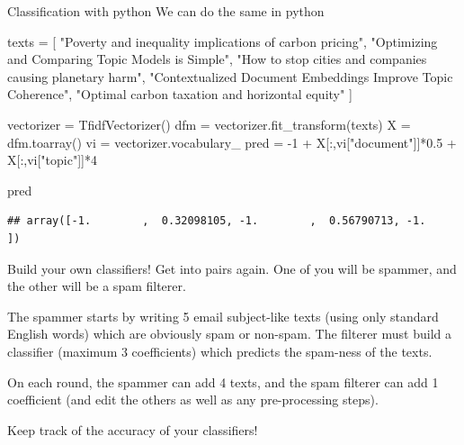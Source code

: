 \documentclass[
  10pt,
  ignorenonframetext,
  aspectratio=169]{beamer}
\newenvironment{Shaded}{\begin{snugshade}}{\end{snugshade}}
\newcommand{\DecValTok}[1]{\textcolor[rgb]{0.86,0.86,0.80}{#1}}
\newcommand{\FloatTok}[1]{\textcolor[rgb]{0.75,0.75,0.82}{#1}}
\newcommand{\NormalTok}[1]{\textcolor[rgb]{0.80,0.80,0.80}{#1}}
\newcommand{\OperatorTok}[1]{\textcolor[rgb]{0.94,0.94,0.82}{#1}}
\newcommand{\StringTok}[1]{\textcolor[rgb]{0.80,0.58,0.58}{#1}}
\begin{document}
\begin{frame}[fragile]{Classification with python}
\protect\hypertarget{classification-with-python}{}
We can do the same in python

\scriptsize

\begin{Shaded}
\begin{Highlighting}[]
\NormalTok{texts }\OperatorTok{=}\NormalTok{ [}
  \StringTok{"Poverty and inequality implications of carbon pricing"}\NormalTok{,}
  \StringTok{"Optimizing and Comparing Topic Models is Simple"}\NormalTok{,}
  \StringTok{"How to stop cities and companies causing planetary harm"}\NormalTok{,}
  \StringTok{"Contextualized Document Embeddings Improve Topic Coherence"}\NormalTok{,}
  \StringTok{"Optimal carbon taxation and horizontal equity"}
\NormalTok{]}

\NormalTok{vectorizer }\OperatorTok{=}\NormalTok{ TfidfVectorizer()}
\NormalTok{dfm }\OperatorTok{=}\NormalTok{ vectorizer.fit\_transform(texts)}
\NormalTok{X }\OperatorTok{=}\NormalTok{ dfm.toarray()}
\NormalTok{vi }\OperatorTok{=}\NormalTok{ vectorizer.vocabulary\_}
\NormalTok{pred }\OperatorTok{=} \OperatorTok{{-}}\DecValTok{1} \OperatorTok{+}\NormalTok{ X[:,vi[}\StringTok{"document"}\NormalTok{]]}\OperatorTok{*}\FloatTok{0.5} \OperatorTok{+}\NormalTok{ X[:,vi[}\StringTok{"topic"}\NormalTok{]]}\OperatorTok{*}\DecValTok{4}

\NormalTok{pred}
\end{Highlighting}
\end{Shaded}

\begin{verbatim}
## array([-1.        ,  0.32098105, -1.        ,  0.56790713, -1.        ])
\end{verbatim}
\end{frame}

\begin{frame}{Build your own classifiers!}
\protect\hypertarget{build-your-own-classifiers}{}
Get into pairs again. One of you will be spammer, and the other will be
a spam filterer.

The spammer starts by writing 5 email subject-like texts (using only
standard English words) which are obviously spam or non-spam. The
filterer must build a classifier (maximum 3 coefficients) which predicts
the spam-ness of the texts.

On each round, the spammer can add 4 texts, and the spam filterer can
add 1 coefficient (and edit the others as well as any pre-processing
steps).

Keep track of the accuracy of your classifiers!
\end{frame}
\end{document}
